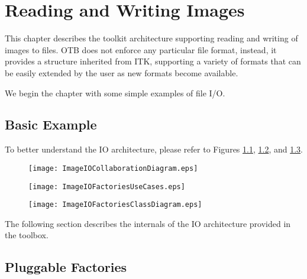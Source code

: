 \chapter{Reading and Writing Images}
\label{sec:IO}

This chapter describes the toolkit architecture supporting reading and
writing of images to files. OTB does not enforce any particular file
format, instead, it provides a structure inherited from ITK,
supporting a variety of formats that can be easily extended by the
user as new formats become available.

We begin the chapter with some simple examples of file I/O.

\section{Basic Example}
\label{sec:ImagReadWrite}


To better understand the IO architecture, please refer to Figures
\ref{fig:ImageIOCollaborationDiagram},
\ref{fig:ImageIOFactoriesUseCases}, and
\ref{fig:ImageIOFactoriesClassDiagram}.

\begin{figure}
\center
\texttt{[image: ImageIOCollaborationDiagram.eps]}
 \label{fig:ImageIOCollaborationDiagram}
\end{figure}

\begin{figure}
\center
\texttt{[image: ImageIOFactoriesUseCases.eps]}
\label{fig:ImageIOFactoriesUseCases}
\end{figure}

\begin{figure}
\center
\texttt{[image: ImageIOFactoriesClassDiagram.eps]}
\label{fig:ImageIOFactoriesClassDiagram}
\end{figure}


The following section describes the internals of the IO architecture provided
in the toolbox.

\section{Pluggable Factories}
\label{sec:ImageIOPluggableFactories}

